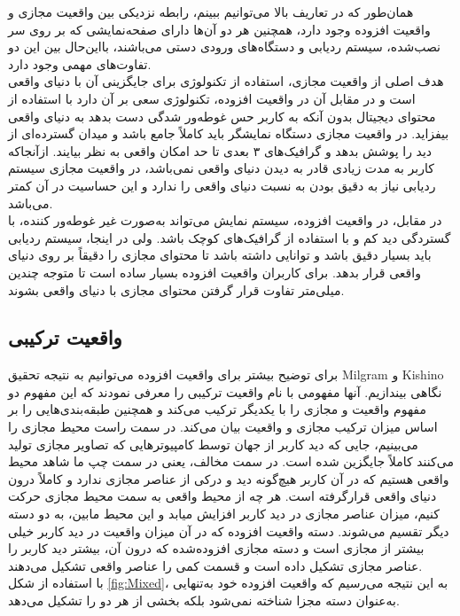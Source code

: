 همان‌طور که در تعاریف بالا می‌توانیم ببینم، رابطه نزدیکی بین واقعیت مجازی و واقعیت افزوده وجود دارد، همچنین هر دو آن‌ها دارای صفحه‌نمایشی که بر روی سر نصب‌شده، سیستم ردیابی و دستگاه‌های ورودی دستی می‌باشند، بااین‌حال بین این دو تفاوت‌های مهمی وجود دارد.
\\
هدف اصلی از واقعیت مجازی، استفاده از تکنولوژی برای جایگزینی آن با دنیای واقعی است و در مقابل آن در واقعیت افزوده، تکنولوژی سعی بر آن دارد  با استفاده از محتوای دیجیتال بدون آنکه به کاربر حس غوطه‌ور شدگی دست بدهد به دنیای واقعی بیفزاید. در واقعیت مجازی دستگاه نمایشگر باید کاملاً جامع باشد و میدان گسترده‌ای از دید را پوشش بدهد و گرافیک‌های ۳ بعدی تا حد امکان واقعی به نظر بیایند. ازآنجاکه کاربر به مدت زیادی قادر به دیدن دنیای واقعی نمی‌باشد، در واقعیت مجازی سیستم ردیابی نیاز به دقیق بودن به نسبت دنیای واقعی را ندارد و این حساسیت در آن کمتر می‌باشد.
\\
در مقابل، در  واقعیت افزوده، سیستم نمایش می‌تواند به‌صورت غیر غوطه‌ور کننده، با گستردگی دید کم و با استفاده از گرافیک‌های کوچک باشد. ولی در اینجا، سیستم ردیابی باید بسیار دقیق باشد و توانایی داشته باشد تا محتوای مجازی را دقیقاً بر روی دنیای واقعی قرار بدهد. برای کاربران واقعیت افزوده بسیار ساده است تا متوجه چندین میلی‌متر تفاوت قرار گرفتن محتوای مجازی با دنیای واقعی بشوند.
\\
\subsection{واقعیت ترکیبی}
برای توضیح بیشتر برای واقعیت افزوده می‌توانیم به نتیجه تحقیق Milgram و Kishino نگاهی بیندازیم\cite{Milgram}. آنها مفهومی با نام واقعیت ترکیبی را معرفی نمودند که این مفهوم دو مفهوم واقعیت و مجازی را با یکدیگر ترکیب می‌کند و همچنین طبقه‌بندی‌هایی را بر اساس میزان ترکیب مجازی و واقعیت بیان می‌کند. در سمت راست محیط مجازی را می‌بینیم، جایی که دید کاربر از جهان توسط کامپیوترهایی که تصاویر مجازی تولید می‌کنند کاملاً جایگزین شده است. در سمت مخالف، یعنی در سمت چپ ما شاهد محیط واقعی هستیم که در آن کاربر هیچ‌گونه دید و درکی از عناصر مجازی ندارد و کاملاً درون دنیای واقعی قرارگرفته است. هر چه از محیط واقعی به سمت محیط مجازی حرکت کنیم، میزان عناصر مجازی در دید کاربر افزایش میابد و این محیط مابین، به دو دسته دیگر تقسیم می‌شوند. دسته واقعیت افزوده که در آن میزان واقعیت در دید کاربر خیلی بیشتر از مجازی است و دسته مجازی افزوده‌شده که درون آن، بیشتر دید کاربر را عناصر مجازی تشکیل داده است و قسمت کمی را عناصر واقعی تشکیل می‌دهند.
\\
با استفاده از شکل \ref{fig:Mixed}، به این نتیجه می‌رسیم که واقعیت افزوده خود به‌تنهایی به‌عنوان دسته مجزا شناخته نمی‌شود بلکه بخشی از هر دو را تشکیل می‌دهد.

